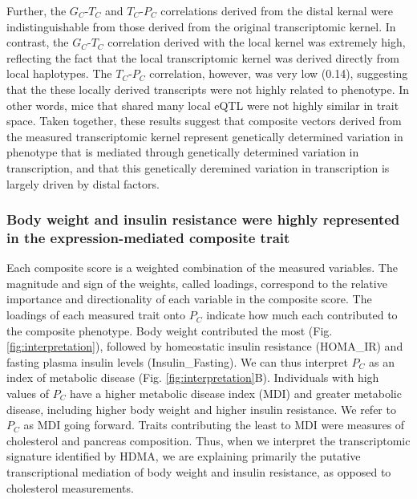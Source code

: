\documentclass[
]{article}
\begin{document}
Further, the \(G_C\)-\(T_C\) and \(T_C\)-\(P_C\) correlations derived
from the distal kernal were indistinguishable from those derived from
the original transcriptomic kernel. In contrast, the \(G_C\)-\(T_C\)
correlation derived with the local kernel was extremely high, reflecting
the fact that the local transcriptomic kernel was derived directly from
local haplotypes. The \(T_C\)-\(P_C\) correlation, however, was very low
(0.14), suggesting that the these locally derived transcripts were not
highly related to phenotype. In other words, mice that shared many local
eQTL were not highly similar in trait space. Taken together, these
results suggest that composite vectors derived from the measured
transcriptomic kernel represent genetically determined variation in
phenotype that is mediated through genetically determined variation in
transcription, and that this genetically deremined variation in
transcription is largely driven by distal factors.

\subsubsection{Body weight and insulin resistance were highly
represented in the expression-mediated composite
trait}\label{body-weight-and-insulin-resistance-were-highly-represented-in-the-expression-mediated-composite-trait}

Each composite score is a weighted combination of the measured
variables. The magnitude and sign of the weights, called loadings,
correspond to the relative importance and directionality of each
variable in the composite score. The loadings of each measured trait
onto \(P_C\) indicate how much each contributed to the composite
phenotype. Body weight contributed the most (Fig.
\ref{fig:interpretation}), followed by homeostatic insulin resistance
(HOMA\_IR) and fasting plasma insulin levels (Insulin\_Fasting). We can
thus interpret \(P_C\) as an index of metabolic disease (Fig.
\ref{fig:interpretation}B). Individuals with high values of \(P_C\) have
a higher metabolic disease index (MDI) and greater metabolic disease,
including higher body weight and higher insulin resistance. We refer to
\(P_C\) as MDI going forward. Traits contributing the least to MDI were
measures of cholesterol and pancreas composition. Thus, when we
interpret the transcriptomic signature identified by HDMA, we are
explaining primarily the putative transcriptional mediation of body
weight and insulin resistance, as opposed to cholesterol measurements.
\end{document}

